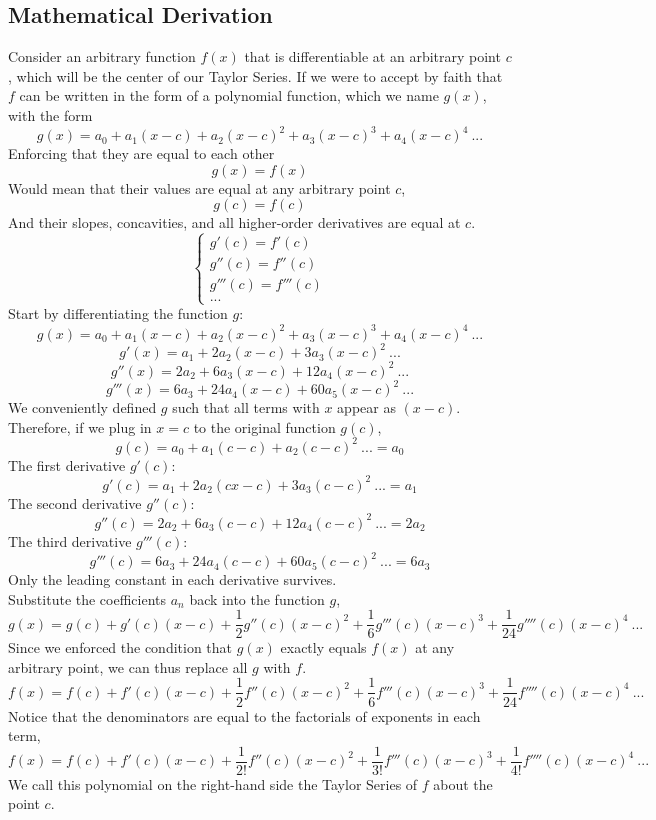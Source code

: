 \documentclass[11pt]{article}
\theoremstyle{gangnamstyle}{\newtheorem{definition}{Definition}[]}
\theoremstyle{gangnamstyle}{\newtheorem{example}{Example}[]}
\theoremstyle{gangnamstyle}{\newtheorem{problem}{Problem}[]}
\theoremstyle{gangnamstyle}{\newtheorem{warning}{Warning}[]}
\begin{document}
\subsection{Mathematical Derivation}

Consider an arbitrary function $f(x)$ that is differentiable at an arbitrary point $c$, which will be the center of our Taylor Series. If we were to accept by faith that $f$ can be written in the form of a polynomial function, which we name $g(x)$, with the form
\[ g(x) = a_0 + a_1(x - c) + a_2(x - c)^2 + a_3(x - c)^3 + a_4(x - c)^4 \ ... \]
Enforcing that they are equal to each other
\[ g(x) = f(x) \]
Would mean that their values are equal at any arbitrary point $c$, 
\[ g(c) = f(c) \]
And their slopes, concavities, and all higher-order derivatives are equal at $c$. 
\[ \begin{cases}
g'(c) = f'(c) \\
g''(c) = f''(c) \\
g'''(c) = f'''(c) \\
...
\end{cases} \]
Start by differentiating the function $g$: 
\[ g(x) = a_0 + a_1(x - c) + a_2(x - c)^2 + a_3(x - c)^3 + a_4(x - c)^4 \ ... \]
\[ g'(x) = a_1 + 2a_2(x - c) + 3a_3(x - c)^2 \ ... \]
\[ g''(x) = 2a_2 + 6a_3(x - c) + 12a_4(x - c)^2 \ ... \]
\[ g'''(x) = 6a_3 + 24a_4(x - c) + 60a_5(x - c)^2 \ ... \]
We conveniently defined $g$ such that all terms with $x$ appear as $(x - c)$. Therefore, if we plug in $x = c$ to the original function $g(c)$,
\[ g(c) = a_0 + a_1(c - c) + a_2(c - c)^2 \ ... = a_0 \]
The first derivative $g'(c)$:
\[ g'(c) = a_1 + 2a_2(cx - c) + 3a_3(c - c)^2 \ ... = a_1 \]
The second derivative $g''(c)$:
\[ g''(c) = 2a_2 + 6a_3(c - c) + 12a_4(c - c)^2 \ ... = 2a_2 \]
The third derivative $g'''(c)$:
\[ g'''(c) = 6a_3 + 24a_4(c - c) + 60a_5(c - c)^2 \ ... = 6a_3 \]
Only the leading constant in each derivative survives. \\
Substitute the coefficients $a_n$ back into the function $g$,
\[ g(x) = g(c) + g'(c)(x - c) + \frac{1}{2}g''(c)(x - c)^2 + \frac{1}{6}g'''(c)(x - c)^3 + \frac{1}{24}g''''(c)(x - c)^4 \ ... \]
Since we enforced the condition that $g(x)$ exactly equals $f(x)$ at any arbitrary point, we can thus replace all $g$ with $f$. 
\[ f(x) = f(c) + f'(c)(x - c) + \frac{1}{2}f''(c)(x - c)^2 + \frac{1}{6}f'''(c)(x - c)^3 + \frac{1}{24}f''''(c)(x - c)^4 \ ... \]
Notice that the denominators are equal to the factorials of exponents in each term, 
\[ f(x) = f(c) + f'(c)(x - c) + \frac{1}{2!}f''(c)(x - c)^2 + \frac{1}{3!}f'''(c)(x - c)^3 + \frac{1}{4!}f''''(c)(x - c)^4 \ ... \]
We call this polynomial on the right-hand side the Taylor Series of $f$ about the point $c$. 
\end{document}
